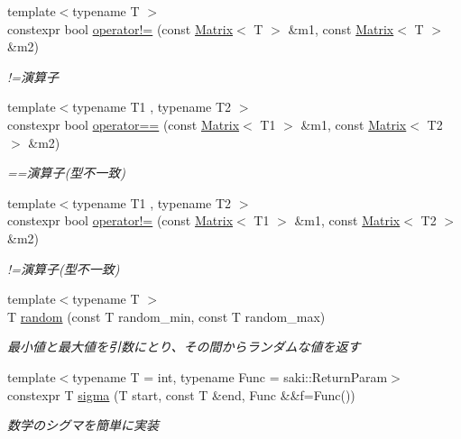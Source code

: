 \begin{DoxyCompactItemize}
{\footnotesize template$<$typename T $>$ }\\constexpr bool \mbox{\hyperlink{namespacesaki_a79218f0b5ef57832094c0fb4b74fb8b2}{operator!=}} (const \mbox{\hyperlink{classsaki_1_1_matrix}{Matrix}}$<$ T $>$ \&m1, const \mbox{\hyperlink{classsaki_1_1_matrix}{Matrix}}$<$ T $>$ \&m2)
\begin{DoxyCompactList}\small\item\em !=演算子 \end{DoxyCompactList}\item 
{\footnotesize template$<$typename T1 , typename T2 $>$ }\\constexpr bool \mbox{\hyperlink{namespacesaki_a57ebf9c4b637e0dff3c957a7b4786332}{operator==}} (const \mbox{\hyperlink{classsaki_1_1_matrix}{Matrix}}$<$ T1 $>$ \&m1, const \mbox{\hyperlink{classsaki_1_1_matrix}{Matrix}}$<$ T2 $>$ \&m2)
\begin{DoxyCompactList}\small\item\em ==演算子(型不一致) \end{DoxyCompactList}\item 
{\footnotesize template$<$typename T1 , typename T2 $>$ }\\constexpr bool \mbox{\hyperlink{namespacesaki_afce7efc7fea0dc8cd8bc6a10d231261e}{operator!=}} (const \mbox{\hyperlink{classsaki_1_1_matrix}{Matrix}}$<$ T1 $>$ \&m1, const \mbox{\hyperlink{classsaki_1_1_matrix}{Matrix}}$<$ T2 $>$ \&m2)
\begin{DoxyCompactList}\small\item\em !=演算子(型不一致) \end{DoxyCompactList}\item 
{\footnotesize template$<$typename T $>$ }\\T \mbox{\hyperlink{namespacesaki_a636caf16f2f00cb734cc867646ac233f}{random}} (const T random\+\_\+min, const T random\+\_\+max)
\begin{DoxyCompactList}\small\item\em 最小値と最大値を引数にとり、その間からランダムな値を返す \end{DoxyCompactList}\item 
{\footnotesize template$<$typename T  = int, typename Func  = saki\+::\+Return\+Param$>$ }\\constexpr T \mbox{\hyperlink{namespacesaki_aa5a82a930469f18d700db4d93b59a7e5}{sigma}} (T start, const T \&end, Func \&\&f=Func())
\begin{DoxyCompactList}\small\item\em 数学のシグマを簡単に実装 \end{DoxyCompactList}\item 

\end{DoxyCompactItemize}
